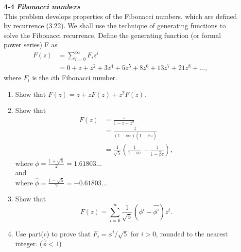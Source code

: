 \documentclass[fontsize=12pt,paper=a4]{book}
\begin{document}
\begin{enumerate}
 \item[\textbf{4-4}]
       \textbf{\textit{Fibonacci numbers}}\\
       This problem develops properties of the Fibonacci numbers, which are defined by recurrence (3.22). We shall use the technique of generating functions to solve the Fibonacci recurrence. Define the generating function (or formal power series) F as
       \begin{equation*}
        \begin{split}
         F(z) & = \sum_{i=0}^\infty F_iz^i\\
         & = 0 + z + z^2 + 3z^4 + 5z^5 + 8z^6 + 13z^7 + 21z^8 + ... ,
        \end{split}
       \end{equation*}
       where $F_i$ is the $i$th Fibonacci number.
       \begin{enumerate}
        \item Show that $F(z) = z + zF(z) + z^2F(z)$.
        \item Show that
              \begin{equation*}
               \begin{split}
                F(z) & = \frac{z}{1-z-z^2} \\
                & = \frac{z}{(1-\phi z)(1-\hat{\phi} z)}\\
                & = \frac{1}{\sqrt{5}} \left( \frac{1}{1-\phi z} - \frac{1}{1-\hat{\phi} z} \right),
               \end{split}
              \end{equation*}
              where $\phi = \frac{1+\sqrt{5}}{2} = 1.61803 \dots$\\
              and\\
              where $\hat{\phi} = \frac{1-\sqrt{5}}{2} = -0.61803 \dots$
        \item Show that
              \[ F(z) = \sum_{i=0}^{\infty} \frac{1}{\sqrt{5}} (\phi^i-\hat{\phi^i}) z^i . \]
        \item Use part(c) to prove that $F_i = \phi^i/\sqrt{5}$ for $i>0$, rounded to the nearest integer. ($\hat{\phi} < 1$)
       \end{enumerate}
       

\end{enumerate}
\end{document}
